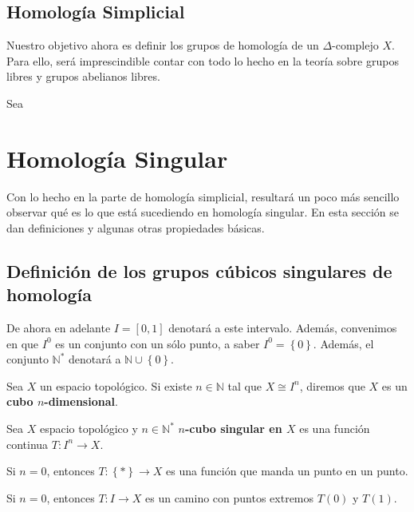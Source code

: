 \documentclass[12pt]{report}
\theoremstyle{largebreak}
\newcommand\cf[3]{\ensuremath{#1:#2\rightarrow#3}}
\begin{document}
    \subsection{Homología Simplicial}

    Nuestro objetivo ahora es definir los grupos de homología de un $\Delta$-complejo $X$. Para ello, será imprescindible contar con todo lo hecho en la teoría sobre grupos libres y grupos abelianos libres.

    \begin{mydef}
        Sea 
    \end{mydef}

    \section{Homología Singular}

    Con lo hecho en la parte de homología simplicial, resultará un poco más sencillo observar qué es lo que está sucediendo en homología singular. En esta sección se dan definiciones y algunas otras propiedades básicas.

    \subsection{Definición de los grupos cúbicos singulares de homología}

    \begin{obs}
        De ahora en adelante $I=[0,1]$ denotará a este intervalo. Además, convenimos en que $I^0$ es un conjunto con un sólo punto, a saber $I^0=\left\{0\right\}$. Además, el conjunto $\mathbb{N}^*$ denotará a $\mathbb{N}\cup\left\{0\right\}.$
    \end{obs}

    \begin{mydef}
        Sea $X$ un espacio topológico. Si existe $n\in\mathbb{N}$ tal que $X\cong I^n$, diremos que $X$ es un \textbf{cubo $n$-dimensional}.
    \end{mydef}

    \begin{mydef}
        Sea $X$ espacio topológico y $n\in\mathbb{N}^*$ \textbf{$n$-cubo singular en $X$} es una función continua $\cf{T}{I^n}{X}$. 
    \end{mydef}

    \begin{exa}
        Si $n=0$, entonces $\cf{T}{\left\{* \right\}}{X}$ es una función que manda un punto en un punto.

        Si $n=0$, entonces $\cf{T}{I}{X}$ es un camino con puntos extremos $T(0)$ y $T(1)$.
    \end{exa}
\end{document}
